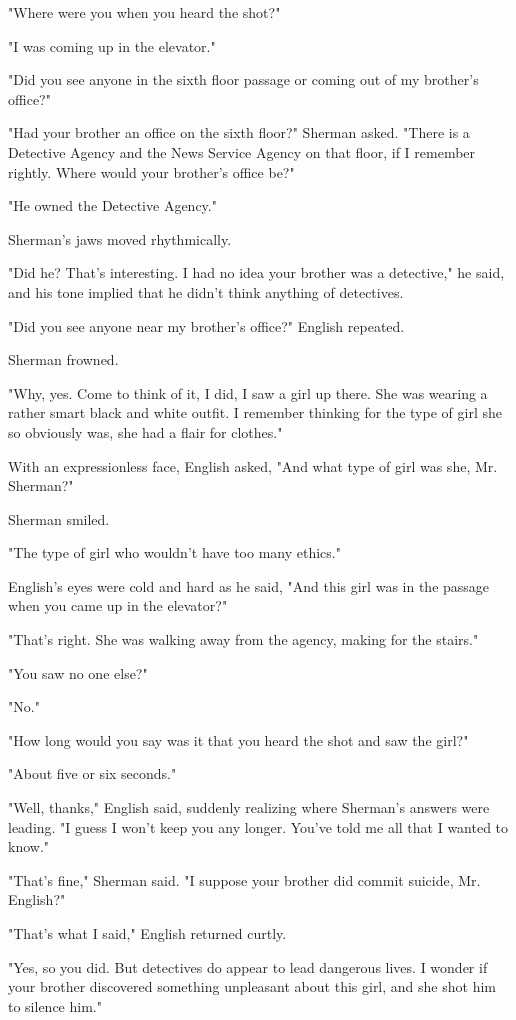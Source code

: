 \documentclass{novel}
\begin{document}
"Where were you when you heard the shot?"

"I was coming up in the elevator."

"Did you see anyone in the sixth floor passage or coming out of my brother's office?"

"Had your brother an office on the sixth floor?" Sherman asked. "There is a Detective Agency and the News Service Agency on that floor, if I remember rightly. Where would your brother's office be?"

"He owned the Detective Agency."

Sherman's jaws moved rhythmically.

"Did he? That's interesting. I had no idea your brother was a detective," he said, and his tone implied that he didn't think anything of detectives.

"Did you see anyone near my brother's office?" English repeated.

Sherman frowned.

"Why, yes. Come to think of it, I did, I saw a girl up there. She was wearing a rather smart black and white outfit. I remember thinking for the type of girl she so obviously was, she had a flair for clothes."

With an expressionless face, English asked, "And what type of girl was she, Mr. Sherman?"

Sherman smiled.

"The type of girl who wouldn't have too many ethics."

English's eyes were cold and hard as he said, "And this girl was in the passage when you came up in the elevator?"

"That's right. She was walking away from the agency, making for the stairs."

"You saw no one else?"

"No."

"How long would you say was it that you heard the shot and saw the girl?"

"About five or six seconds."

"Well, thanks," English said, suddenly realizing where Sherman's answers were leading. "I guess I won't keep you any longer. You've told me all that I wanted to know."

"That's fine," Sherman said. "I suppose your brother did commit suicide, Mr. English?"

"That's what I said," English returned curtly.

"Yes, so you did. But detectives do appear to lead dangerous lives. I wonder if your brother discovered something unpleasant about this girl, and she shot him to silence him."
\end{document}
